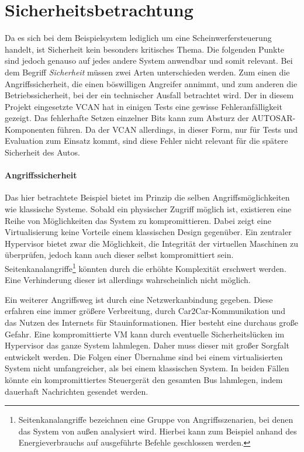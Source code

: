 \documentclass[
  a4paper,					    %
  twoside,
  DIV=calc,     				%
  bibliography=totoc,
  cleardoublepage=empty,
  ngerman,     					%
  final       					%
]{scrbook}
\begin{document}
\section{Sicherheitsbetrachtung}
\label{sec:Sicherheit_Beispiel}
Da es sich bei dem Beispielsystem lediglich um eine Scheinwerfersteuerung handelt, ist Sicherheit kein besonders kritisches Thema. Die folgenden Punkte sind jedoch genauso auf jedes andere System anwendbar und somit relevant. Bei dem Begriff \emph{Sicherheit} müssen zwei Arten unterschieden werden. Zum einen die Angriffssicherheit, die einen böswilligen Angreifer annimmt, und zum anderen die Betriebssicherheit, bei der ein technischer Ausfall betrachtet wird. Der in diesem Projekt eingesetzte VCAN hat in einigen Tests eine gewisse Fehleranfälligkeit gezeigt. Das fehlerhafte Setzen einzelner Bits kann zum Absturz der AUTOSAR-Komponenten führen. Da der VCAN allerdings, in dieser Form, nur für Tests und Evaluation zum Einsatz kommt, sind diese Fehler nicht relevant für die spätere Sicherheit des Autos.

\paragraph{Angriffssicherheit}
Das hier betrachtete Beispiel bietet im Prinzip die selben Angriffsmöglichkeiten wie klassische Systeme. Sobald ein physischer Zugriff möglich ist, existieren eine Reihe von Möglichkeiten das System zu kompromittieren. Dabei zeigt eine Virtualisierung keine Vorteile einem klassischen Design gegenüber. Ein zentraler Hypervisor bietet zwar die Möglichkeit, die Integrität der virtuellen Maschinen zu überprüfen, jedoch kann auch dieser selbst kompromittiert sein. Seitenkanalangriffe\footnote{Seitenkanalangriffe bezeichnen eine Gruppe von Angriffsszenarien, bei denen das System von außen analysiert wird. Hierbei kann zum Beispiel anhand des Energieverbrauchs auf ausgeführte Befehle geschlossen werden.} könnten durch die erhöhte Komplexität erschwert werden. Eine Verhinderung dieser ist allerdings wahrscheinlich nicht möglich.

Ein weiterer Angriffsweg ist durch eine Netzwerkanbindung gegeben. Diese erfahren eine immer größere Verbreitung, durch Car2Car-Kommunikation und das Nutzen des Internets für Stauinformationen. Hier besteht eine durchaus große Gefahr. Eine kompromittierte VM kann durch eventuelle Sicherheitslücken im Hypervisor das ganze System lahmlegen. Daher muss dieser mit großer Sorgfalt entwickelt werden. Die Folgen einer Übernahme sind bei einem virtualisierten System nicht umfangreicher, als bei einem klassischen System. In beiden Fällen könnte ein kompromittiertes Steuergerät den gesamten Bus lahmlegen, indem dauerhaft Nachrichten gesendet werden.
\end{document}
